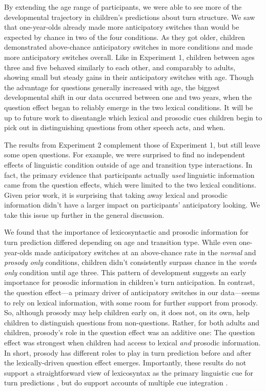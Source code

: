 \documentclass[authoryear, 12pt]{elsarticle}
\begin{document}
By extending the age range of participants, we were able to see more of the developmental trajectory in children's predictions about turn structure. We saw that one-year-olds already made more anticipatory switches than would be expected by chance in two of the four conditions. As they got older, children demonstrated above-chance anticipatory switches in more conditions and made more anticipatory switches overall. Like in Experiment 1, children between ages three and five behaved similarly to each other, and comparably to adults, showing small but steady gains in their anticipatory switches with age. Though the advantage for questions generally increased with age, the biggest developmental shift in our data occurred between one and two years, when the question effect began to reliably emerge in the two lexical conditions. It will be up to future work to disentangle which lexical and prosodic cues children begin to pick out in distinguishing questions from other speech acts, and when.

The results from Experiment 2 complement those of Experiment 1, but still leave some open questions. For example, we were surprised to find no independent effects of linguistic condition outside of age and transition type interactions. In fact, the primary evidence that participants actually \textit{used} linguistic information came from the question effects, which were limited to the two lexical conditions. Given prior work, it is surprising that taking away lexical and prosodic information didn't have a larger impact on participants' anticipatory looking. We take this issue up further in the general discussion.

We found that the importance of lexicosyntactic and prosodic information for turn prediction differed depending on age and transition type. While even one-year-olds made anticipatory switches at an above-chance rate in the \textit{normal} and \textit{prosody only} conditions, children didn't consistently surpass chance in the \textit{words only} condition until age three. This pattern of development suggests an early importance for prosodic information in children's turn anticipation. In contrast, the question effect---a primary driver of anticipatory switches in our data---seems to rely on lexical information, with some room for further support from prosody. So, although prosody may help children early on, it does not, on its own, help children to distinguish questions from non-questions. Rather, for both adults and children, prosody's role in the question effect was an additive one: The question effect was strongest when children had access to lexical \textit{and} prosodic information. In short, prosody has different roles to play in turn prediction before and after the lexically-driven question effect emerges. Importantly, these results do not support a straightforward view of lexicosyntax as the primary linguistic cue for turn predictions \citep[even for adults; ][]{de-ruiter2006, magyari2012}, but do support accounts of multiple cue integration \citep{duncan1972, ford1996, hirvenkari2013, torreiraUndRev}.
\end{document}
